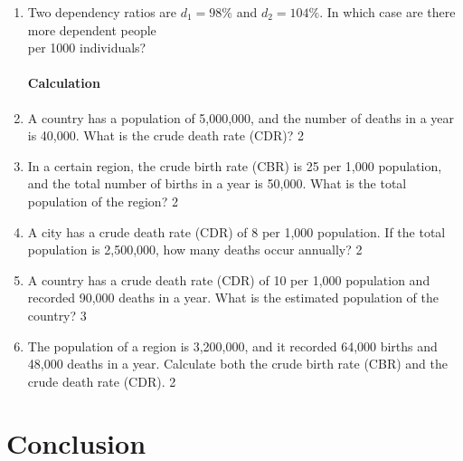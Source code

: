 \documentclass[a4paper,oneside, margin=1.4in]{book}
\begin{document}
\begin{enumerate}
  \item Two dependency ratios are $d_1=98\%$ and $d_2=104\%$. 
  In which case are there more dependent people \\ per 1000 individuals? \hfill 
  
 \subsubsection{Calculation}
 
 \item A country has a population of 5,000,000, and the number of deaths in a year is 40,000. What is the crude death rate (CDR)? \hfill 2  

\item In a certain region, the crude birth rate (CBR) is 25 per 1,000 population, and the total number of births in a year is 50,000. What is the total population of the region? \hfill 2

\item A city has a crude death rate (CDR) of 8 per 1,000 population. If the total population is 2,500,000, how many deaths occur annually? \hfill 2  

\item A country has a crude death rate (CDR) of 10 per 1,000 population and recorded 90,000 deaths in a year. What is the estimated population of the country? \hfill 3  

\item The population of a region is 3,200,000, and it recorded 64,000 births and 48,000 deaths in a year. Calculate both the crude birth rate (CBR) and the crude death rate (CDR). \hfill 2


  
    \end{enumerate}

\backmatter
\chapter{Conclusion}
\lipsum[8]

\tableofcontents
\end{document}
